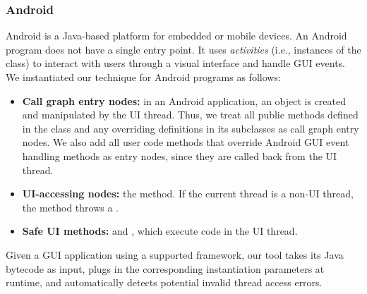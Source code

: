\smallstep

\tinystep
\subsubsection{Android}

Android is a Java-based platform for embedded or mobile devices. 
An Android program does not have a single entry point.
It uses \textit{activities}
(i.e., instances of the  class)
to interact with users through a visual interface and handle GUI events.
We instantiated our technique for Android programs as follows:


\preitemizespace

\begin{itemize}

\item \textbf{Call graph entry nodes:} in an Android application,
an  object is created and manipulated by the UI thread. Thus, we treat
all public methods defined in the  class 
and any overriding definitions in its subclasses as call graph entry nodes.
We also add all user code methods that override Android GUI event handling methods
as entry nodes, since they are called back from the UI thread.

\tinystep

\item \textbf{UI-accessing nodes:} the  method.
If the current
thread is a non-UI thread, the  method throws
a .

\tinystep

\item \textbf{Safe UI methods:}  
and , which execute code in the UI thread. 

\end{itemize}

\tinystep

Given a GUI application using a supported framework, our tool 
takes its Java bytecode as input, 
plugs in the corresponding instantiation parameters at runtime,
and automatically detects potential invalid thread access
errors.

